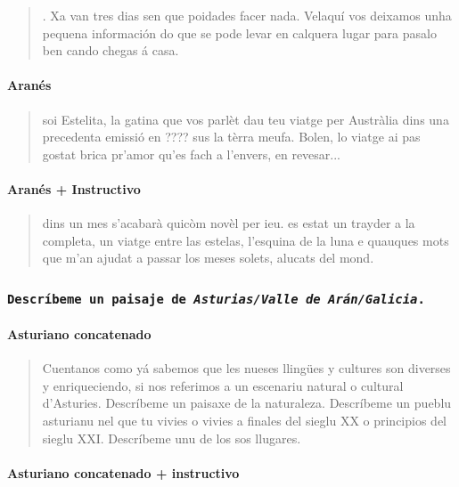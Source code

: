 \begin{quote}
. Xa van tres dias sen que poidades facer nada. Velaquí vos deixamos unha pequena información do que se pode levar en calquera lugar para pasalo ben cando chegas á casa.
\end{quote}

\paragraph{Aranés}

\begin{quote}
soi Estelita, la gatina que vos parlèt dau teu viatge per Austràlia dins una precedenta emissió en ???? sus la tèrra meufa. Bolen, lo viatge ai pas gostat brica pr'amor qu'es fach a l'envers, en revesar...
\end{quote}

\paragraph{Aranés + Instructivo}

\begin{quote}
dins un mes s'acabarà quicòm novèl per ieu. es estat un trayder a la completa, un viatge entre las estelas, l'esquina de la luna e quauques mots que m'an ajudat a passar los meses solets, alucats del mond.
\end{quote}

\subsubsection{\fontsize{15}{15}\texttt{Descríbeme un paisaje de \textit{Asturias/Valle de Arán/Galicia}.}}

\paragraph{Asturiano concatenado}

\begin{quote}
Cuentanos como yá sabemos que les nueses llingües y cultures son diverses y enriqueciendo, si nos referimos a un escenariu natural o cultural d'Asturies.
Descríbeme un paisaxe de la naturaleza.
Descríbeme un pueblu asturianu nel que tu vivies o vivies a finales del sieglu XX o principios del sieglu XXI.
Descríbeme unu de los sos llugares.
\end{quote}

\paragraph{Asturiano concatenado + instructivo}

